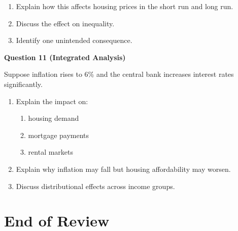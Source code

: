 \documentclass[12pt]{article}
\begin{document}
\begin{enumerate}[label=(\alph*)]
\item Explain how this affects housing prices in the short run and long run.
\item Discuss the effect on inequality.
\item Identify one unintended consequence.
\end{enumerate}

\vspace{1em}

\textbf{Question 11 (Integrated Analysis)}

Suppose inflation rises to 6\% and the central bank increases interest rates significantly.

\begin{enumerate}[label=(\alph*)]
\item Explain the impact on:
\begin{enumerate}
\item housing demand
\item mortgage payments
\item rental markets
\end{enumerate}
\item Explain why inflation may fall but housing affordability may worsen.
\item Discuss distributional effects across income groups.
\end{enumerate}

\section*{End of Review}
\end{document}
